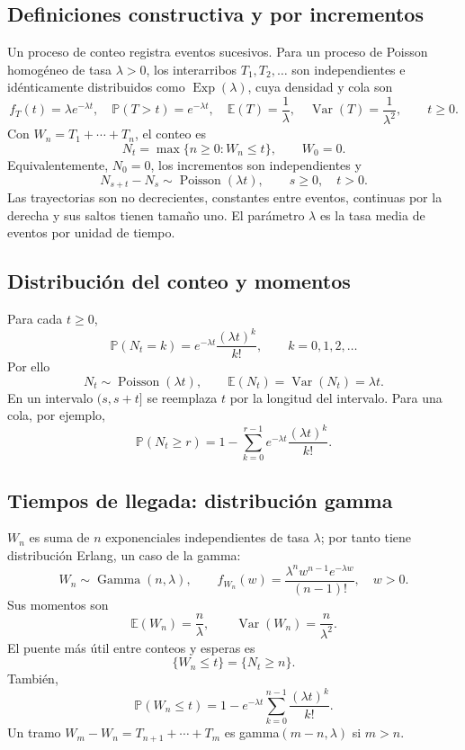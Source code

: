 \documentclass[11pt,oneside]{article}
\newcommand{\E}{\mathbb{E}}
\newcommand{\Prob}{\mathbb{P}}
\newcommand{\Var}{\operatorname{Var}}
\newcommand{\Pois}{\operatorname{Poisson}}
\newcommand{\Exp}{\operatorname{Exp}}
\newcommand{\GammaDist}{\operatorname{Gamma}}
\newcommand{\1}{\mathbf{1}}
\begin{document}
\subsection{Definiciones constructiva y por incrementos}

Un proceso de conteo registra eventos sucesivos. Para un proceso de Poisson homogéneo de tasa $\lambda>0$, los interarribos $T_1,T_2,\ldots$ son independientes e idénticamente distribuidos como $\Exp(\lambda)$, cuya densidad y cola son
\[
f_T(t)=\lambda e^{-\lambda t},\quad \Prob(T>t)=e^{-\lambda t},\quad
\E(T)=\frac1\lambda,\quad \Var(T)=\frac1{\lambda^2},\qquad t\geq0.
\]
Con $W_n=T_1+\cdots+T_n$, el conteo es
\[
N_t=\max\{n\geq0:W_n\leq t\},\qquad W_0=0.
\]
Equivalentemente, $N_0=0$, los incrementos son independientes y
\[
N_{s+t}-N_s\sim\Pois(\lambda t),\qquad s\geq0,\quad t>0.
\]
Las trayectorias son no decrecientes, constantes entre eventos, continuas por la derecha y sus saltos tienen tamaño uno. El parámetro $\lambda$ es la tasa media de eventos por unidad de tiempo.

\subsection{Distribución del conteo y momentos}

Para cada $t\geq0$,
\[
\boxed{\Prob(N_t=k)=e^{-\lambda t}\frac{(\lambda t)^k}{k!},\qquad k=0,1,2,\ldots}
\]
Por ello
\[
N_t\sim\Pois(\lambda t),\qquad \E(N_t)=\Var(N_t)=\lambda t.
\]
En un intervalo $(s,s+t]$ se reemplaza $t$ por la longitud del intervalo. Para una cola, por ejemplo,
\[
\Prob(N_t\geq r)=1-\sum_{k=0}^{r-1}e^{-\lambda t}\frac{(\lambda t)^k}{k!}.
\]

\subsection{Tiempos de llegada: distribución gamma}

$W_n$ es suma de $n$ exponenciales independientes de tasa $\lambda$; por tanto tiene distribución Erlang, un caso de la gamma:
\[
W_n\sim\GammaDist(n,\lambda),\qquad
f_{W_n}(w)=\frac{\lambda^n w^{n-1}e^{-\lambda w}}{(n-1)!},\quad w>0.
\]
Sus momentos son
\[
\E(W_n)=\frac{n}{\lambda},\qquad \Var(W_n)=\frac{n}{\lambda^2}.
\]
El puente más útil entre conteos y esperas es
\[
\boxed{\{W_n\leq t\}=\{N_t\geq n\}.}
\]
También,
\[
\Prob(W_n\leq t)=1-e^{-\lambda t}\sum_{k=0}^{n-1}\frac{(\lambda t)^k}{k!}.
\]
Un tramo $W_m-W_n=T_{n+1}+\cdots+T_m$ es gamma$(m-n,\lambda)$ si $m>n$.
\end{document}
